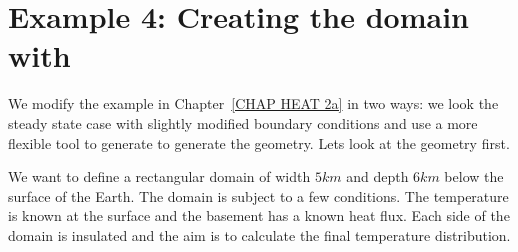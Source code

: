 \section{Example 4: Creating the domain with \pycad}
\label{example4}

We modify the example in Chapter~\ref{CHAP HEAT 2a} in two ways: we look the
steady state 
case with slightly modified boundary conditions and use a more flexible tool 
to generate to generate the geometry. Lets look at the geometry first. 

We want to define a rectangular domain of width $5 km$ and depth $6 km$ below
the surface of the Earth. The domain is subject to a few conditions. The
temperature is known at the surface and the basement has a known heat flux. Each
side of the domain is insulated and the aim is to calculate the final
temperature distribution.

